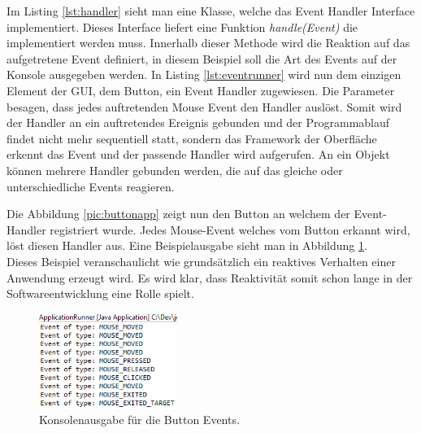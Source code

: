 Im Listing \ref{lst:handler} sieht man eine Klasse, welche das Event Handler Interface implementiert. Dieses Interface liefert eine Funktion \textit{handle(Event)} die implementiert werden muss. Innerhalb dieser Methode wird die Reaktion auf das aufgetretene Event definiert, in diesem Beispiel soll die Art des Events auf der Konsole ausgegeben werden. In Listing \ref{lst:eventrunner} wird nun dem einzigen Element der GUI, dem Button, ein Event Handler zugewiesen. Die Parameter besagen, dass jedes auftretenden Mouse Event den Handler auslöst. Somit wird der Handler an ein auftretendes Ereignis gebunden und der Programmablauf findet nicht mehr sequentiell statt, sondern das Framework der Oberfläche erkennt das Event und der passende Handler wird aufgerufen. An ein Objekt können mehrere Handler gebunden werden, die auf das gleiche oder unterschiedliche Events reagieren.

Die Abbildung \ref{pic:buttonapp} zeigt nun den Button an welchem der Event-Handler registriert wurde. Jedes Mouse-Event welches vom Button erkannt wird, löst diesen Handler aus. Eine Beispielausgabe sieht man in Abbildung \ref{pic:consoleoutput}. \\ Dieses Beispiel veranschaulicht wie grundsätzlich ein reaktives Verhalten einer Anwendung erzeugt wird. Es wird klar, dass Reaktivität somit schon lange in der Softwareentwicklung eine Rolle spielt.
\begin{figure}[htb]
	\centering
	\includegraphics[width=0.4\textwidth]{Abb/consoleoutput.PNG}
	\caption{Konsolenausgabe für die Button Events.}
	\label{pic:consoleoutput}
\end{figure}
